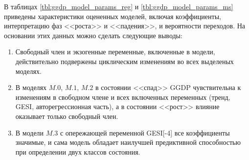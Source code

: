 \documentclass[a4paper,14pt]{extreport}
\begin{document}
В таблицах \ref{tbl:ggdp_model_params_reg} и \ref{tbl:ggdp_model_params_ms} приведены характеристики оцененных моделей, включая коэффициенты, интерпретацию фаз <<роста>> и <<падения>>, и вероятности переходов. На основании этих данных можно сделать следующие выводы:

\begin{enumerate}
	\item Свободный член и экзогенные переменные, включенные в модели, действительно подвержены циклическим изменениям во всех выделеных моделях.
	\item В моделях $M.0$, $M.1$, $M.2$ в состоянии <<спад>> GGDP чувствительна к изменениям в свободном члене и всех включенных переменных (тренд, GESI, авторегрессионная часть), а в состоянии <<рост>> влияние оказывает только свободный член.
	\item В модели $M.3$ с опережающей переменной GESI[-4] все коэффициенты значимые, и сама модель обладает наилучшей предиктивной способностью при определении двух классов состояния.
\end{enumerate}
\end{document}

